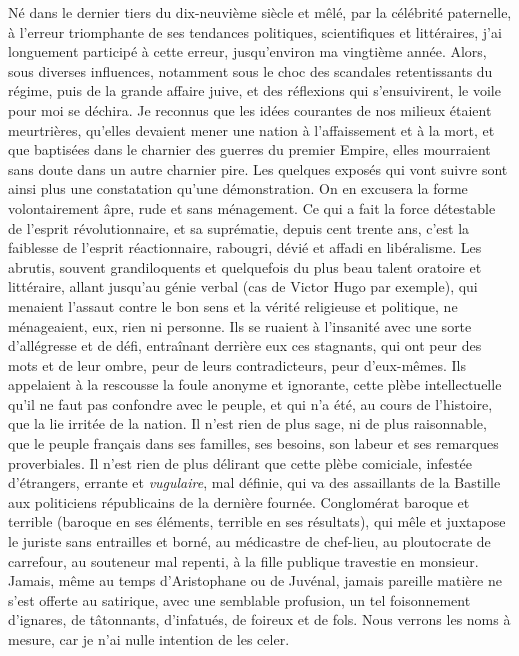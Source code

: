 \documentclass[french,twoside]{book} %
\newcommand\chaptercont{} %
\renewcommand\chaptercont{} %
\begin{document}
\chaptercont
\noindent Né dans le dernier tiers du dix-neuvième siècle et mêlé, par la célébrité paternelle, à l’erreur triomphante de ses tendances politiques, scientifiques et littéraires, j’ai longuement participé à cette erreur, jusqu’environ ma vingtième année. Alors, sous diverses influences, notamment sous le choc des scandales retentissants du régime, puis de la grande affaire juive, et des réflexions qui s’ensuivirent, le voile pour moi se déchira. Je reconnus que les idées courantes de nos milieux étaient meurtrières, qu’elles devaient mener une nation à l’affaissement et à la mort, et que baptisées dans le charnier des guerres du premier Empire, elles mourraient sans doute dans un autre charnier pire. Les quelques exposés qui vont suivre sont ainsi plus une constatation qu’une démonstration. On en excusera la forme volontairement âpre, rude et sans ménagement. Ce qui a fait la force détestable de l’esprit révolutionnaire, et sa suprématie, depuis cent trente ans, c’est la faiblesse de l’esprit réactionnaire, rabougri, dévié et affadi en libéralisme. Les abrutis, souvent grandiloquents et quelquefois du plus beau talent oratoire et littéraire, allant jusqu’au génie verbal (cas de Victor Hugo par exemple), qui menaient l’assaut contre le bon sens et la vérité religieuse et politique, ne ménageaient, eux, rien ni personne. Ils se ruaient à l’insanité avec une sorte d’allégresse et de défi, entraînant derrière eux ces stagnants, qui ont peur des mots et de leur ombre, peur de leurs contradicteurs, peur d’eux-mêmes. Ils appelaient à la rescousse la foule anonyme et ignorante, cette plèbe intellectuelle qu’il ne faut pas confondre avec le peuple, et qui n’a été, au cours de l’histoire, que la lie irritée de la nation. Il n’est rien de plus sage, ni de plus raisonnable, que le peuple français dans ses familles, ses besoins, son labeur et ses remarques proverbiales. Il n’est rien de plus délirant que cette plèbe comiciale, infestée d’étrangers, errante et {\itshape vugulaire}, mal définie, qui va des assaillants de la Bastille aux politiciens républicains de la dernière fournée. Conglomérat baroque et terrible (baroque en ses éléments, terrible en ses résultats), qui mêle et juxtapose le juriste sans entrailles et borné, au médicastre de chef-lieu, au ploutocrate de carrefour, au souteneur mal repenti, à la fille publique travestie en monsieur. Jamais, même au temps d’Aristophane ou de Juvénal, jamais pareille matière ne s’est offerte au satirique, avec une semblable profusion, un tel foisonnement d’ignares, de tâtonnants, d’infatués, de foireux et de fols. Nous verrons les noms à mesure, car je n’ai nulle intention de les celer.\par
\end{document}
